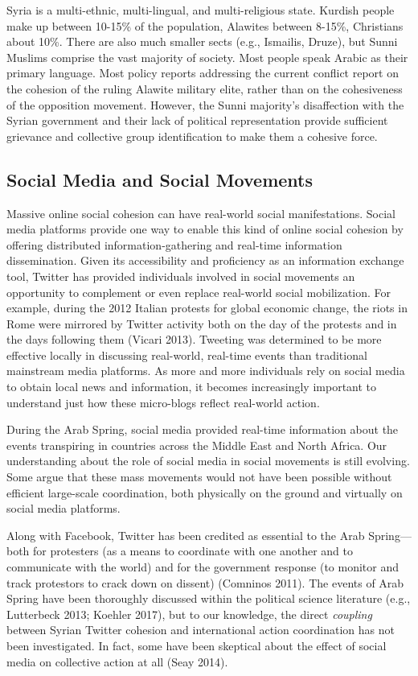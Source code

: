 \documentclass[
  english,
  man]{apa6}
\begin{document}
Syria is a multi-ethnic, multi-lingual, and multi-religious state. Kurdish
people make up between 10-15\% of the population, Alawites between 8-15\%,
Christians about 10\%. There are also much smaller sects (e.g., Ismailis, Druze),
but Sunni Muslims comprise the vast majority of society. Most people speak
Arabic as their primary language. Most policy reports addressing the current
conflict report on the cohesion of the ruling Alawite military elite, rather
than on the cohesiveness of the opposition movement. However, the Sunni
majority's disaffection with the Syrian government and their lack of political
representation provide sufficient grievance and collective group identification
to make them a cohesive force.

\hypertarget{social-media-and-social-movements}{%
\subsection{Social Media and Social Movements}\label{social-media-and-social-movements}}

Massive online social cohesion can have real-world social manifestations. Social
media platforms provide one way to enable this kind of online social cohesion by
offering distributed information-gathering and real-time information
dissemination. Given its accessibility and proficiency as an information
exchange tool, Twitter has provided individuals involved in social movements an
opportunity to complement or even replace real-world social mobilization. For
example, during the 2012 Italian protests for global economic change, the riots
in Rome were mirrored by Twitter activity both on the day of the protests and in
the days following them (Vicari 2013). Tweeting was determined to be more
effective locally in discussing real-world, real-time events than traditional
mainstream media platforms. As more and more individuals rely on social media to
obtain local news and information, it becomes increasingly important to
understand just how these micro-blogs reflect real-world action.

During the Arab Spring, social media provided real-time information about the
events transpiring in countries across the Middle East and North Africa. Our
understanding about the role of social media in social movements is still
evolving. Some argue that these mass movements would not have been possible
without efficient large-scale coordination, both physically on the ground and
virtually on social media platforms.

Along with Facebook, Twitter has been credited as essential to the Arab
Spring---both for protesters (as a means to coordinate with one another and to
communicate with the world) and for the government response (to monitor and
track protestors to crack down on dissent) (Comninos 2011). The events of
Arab Spring have been thoroughly discussed within the political science
literature (e.g., Lutterbeck 2013; Koehler 2017), but to our knowledge, the direct \emph{coupling} between
Syrian Twitter cohesion and international action coordination has not been
investigated. In fact, some have been skeptical about the effect of social media
on collective action at all (Seay 2014).
\end{document}
